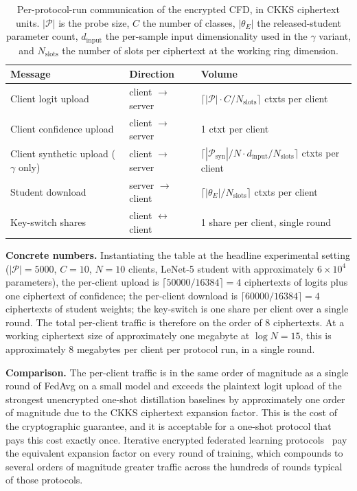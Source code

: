 \begin{table}[t]
\centering
\small
\caption{Per-protocol-run communication of the encrypted CFD, in CKKS ciphertext units. $|\mathcal{P}|$ is the probe size, $C$ the number of classes, $|\theta_E|$ the released-student parameter count, $d_{\text{input}}$ the per-sample input dimensionality used in the $\gamma$ variant, and $N_{\text{slots}}$ the number of slots per ciphertext at the working ring dimension.}
\label{tab:comm_complexity}
\begin{tabular}{@{}l l l@{}}
\toprule
Message & Direction & Volume \\
\midrule
Client logit upload & client $\to$ server & $\lceil |\mathcal{P}|\cdot C / N_{\text{slots}}\rceil$ ctxts per client \\
Client confidence upload & client $\to$ server & 1 ctxt per client \\
Client synthetic upload ($\gamma$ only) & client $\to$ server & $\lceil |\mathcal{P}_{\text{syn}}|/N \cdot d_{\text{input}} / N_{\text{slots}}\rceil$ ctxts per client \\
Student download & server $\to$ client & $\lceil |\theta_E| / N_{\text{slots}}\rceil$ ctxts per client \\
Key-switch shares & client $\leftrightarrow$ client & 1 share per client, single round \\
\bottomrule
\end{tabular}
\end{table}

\par\noindent\textbf{Concrete numbers.} Instantiating the table at the headline experimental setting ($|\mathcal P| = 5000$, $C = 10$, $N = 10$ clients, LeNet-5 student with approximately $6\!\times\!10^4$ parameters), the per-client upload is $\lceil 50000/16384\rceil = 4$ ciphertexts of logits plus one ciphertext of confidence; the per-client download is $\lceil 60000/16384\rceil = 4$ ciphertexts of student weights; the key-switch is one share per client over a single round. The total per-client traffic is therefore on the order of 8 ciphertexts. At a working ciphertext size of approximately one megabyte at $\log N = 15$, this is approximately 8 megabytes per client per protocol run, in a single round.

\par\noindent\textbf{Comparison.} The per-client traffic is in the same order of magnitude as a single round of FedAvg on a small model and exceeds the plaintext logit upload of the strongest unencrypted one-shot distillation baselines by approximately one order of magnitude due to the CKKS ciphertext expansion factor. This is the cost of the cryptographic guarantee, and it is acceptable for a one-shot protocol that pays this cost exactly once. Iterative encrypted federated learning protocols~\cite{sav2021poseidon, zhang2020batchcrypt} pay the equivalent expansion factor on every round of training, which compounds to several orders of magnitude greater traffic across the hundreds of rounds typical of those protocols.


